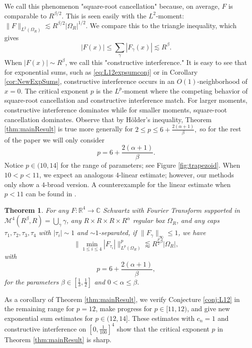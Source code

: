 \documentclass[12pt]{amsart}
\newtheorem{theorem}{Theorem}[section]
\providecommand{\C}{\mathbb C}
\providecommand{\R}{\mathbb R}
\providecommand{\M}{\mathcal{M}}
\begin{document}
%
We call this phenomenon "square-root cancellation" because, on average, $F$ is comparable to  $R^{\beta/2}$. This is seen easily with the $L^2$-moment: $\|F\|_{L^2(\Omega_R)}\lesssim R^{\beta/2}|\Omega_R|^{1/2}$. We compare this to the triangle inequality, which gives $$|F(x)|\le \sum_{\gamma}|F_\gamma(x)|\lesssim R^{\beta}.$$ When $|F(x)|\sim R^{\beta}$, we call this "constructive interference." It is easy to see that for exponential sums, such as \eqref{eq:L12expsumconj} or in Corollary \ref{cor:NewExpSums}, constructive interference occurs in an $O(1)$-neighborhood of $x=0$. The critical exponent $p$ is the $L^p$-moment where the competing behavior of square-root cancellation and constructive interference match. For larger moments, constructive interference dominates while for smaller moments, square-root cancellation dominates. Observe that by H\"{o}lder's inequality, Theorem \ref{thm:mainResult} is true more generally for $2\le p\le 6+\frac{2(\alpha+1)}{\beta},$ so for the rest of the paper we will only consider $$p= 6+\frac{2(\alpha+1)}{\beta}.$$ Notice $p\in (10, 14]$ for the range of parameters; see Figure \ref{fig:trapezoid}. When $10< p< 11$, we expect an analogous $4$-linear estimate; however, our methods only show a $4$-broad version. A counterexample for the linear estimate when $p<11$ can be found in \cite[Theorem 8.2]{demeter2021l12squarerootcancellation}.
\begin{theorem}\label{thm:p<11}
    For any $F:\R^4\to \C$ Schwartz with Fourier Transform supported in $\M^4(R^{\beta}, R)= \bigcup_{\gamma}\gamma$, any $R\times R\times R\times R^{\alpha}$ regular box $\Omega_R$, and any caps $\tau_1, \tau_2, \tau_3, \tau_4$ with $|\tau_i|\sim 1$ and $\sim 1$-separated, if $\|F_\gamma\|_\infty \le 1$, we have $$\|\min_{1\le i\le 4}|F_{\tau_i}|\|_{L^{p}(\Omega_R)}^{p}\lessapprox R^{\frac{p}{2}\beta} |\Omega_R|,$$ with $$p= 6+\frac{2(\alpha+1)}{\beta},$$ for the parameters $\beta\in [\frac{1}{3}, \frac{1}{2}]$ and $0<\alpha\le \beta$.
\end{theorem}

As a corollary of Theorem \ref{thm:mainResult}, we verify  Conjecture \ref{conj:L12} in the remaining range for $p=12$, make progress for $p\in [11, 12)$, and give new exponential sum estimates for $p\in (12, 14]$. These estimates with $c_n=1$ and constructive interference on $[0, \frac{1}{100}]^4$ show that the critical exponent $p$ in Theorem \ref{thm:mainResult} is sharp.
\end{document}
